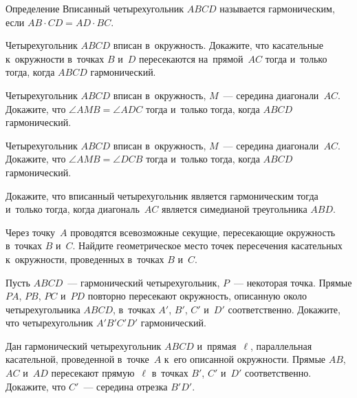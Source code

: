 


\begin{claim}{Определение}
Вписанный четырехугольник $ABCD$ называется гармоническим, если
$AB \cdot CD = AD \cdot BC$.
\end{claim}

\begin{problems}

\item
Четырехугольник $ABCD$ вписан в~окружность.
Докажите, что касательные к~окружности в~точках $B$ и~$D$ пересекаются
на~прямой~$AC$ тогда и~только тогда, когда $ABCD$ гармонический.

\item
Четырехугольник $ABCD$ вписан в~окружность, $M$~--- середина диагонали~$AC$.
Докажите, что $\angle AMB = \angle ADC$ тогда и~только тогда, когда
$ABCD$ гармонический.

\item
Четырехугольник $ABCD$ вписан в~окружность, $M$~--- середина диагонали~$AC$.
Докажите, что $\angle AMB = \angle DCB$ тогда и~только тогда, когда $ABCD$
гармонический.

\item
Докажите, что вписанный четырехугольник является гармоническим тогда и~только
тогда, когда диагональ~$AC$ является симедианой треугольника $ABD$.

\item
Через точку~$A$ проводятся всевозможные секущие, пересекающие окружность
в~точках $B$ и~$C$.
Найдите геометрическое место точек пересечения касательных к~окружности,
проведенных в~точках $B$ и~$C$.

\item
Пусть $ABCD$~--- гармонический четырехугольник, $P$~--- некоторая точка.
Прямые $PA$, $PB$, $PC$ и~$PD$ повторно пересекают окружность, описанную
около четырехугольника $ABCD$, в~точках $A'$, $B'$, $C'$ и~$D'$ соответственно.
Докажите, что четырехугольник $A'B'C'D'$ гармонический.

\item
Дан гармонический четырехугольник $ABCD$ и~прямая~$\ell$, параллельная
касательной, проведенной в~точке~$A$ к~его описанной окружности.
Прямые $AB$, $AC$ и~$AD$ пересекают прямую~$\ell$ в~точках $B'$, $C'$ и~$D'$
соответственно.
Докажите, что $C'$~--- середина отрезка $B'D'$.


\end{problems}

